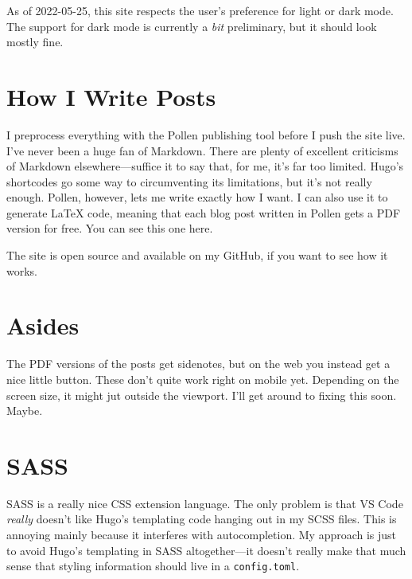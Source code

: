 \documentclass[a4paper,11pt,oneside,article]{memoir}
\begin{document}
As of 2022-05-25, this site respects the user's preference for light or dark mode. The support for dark mode is currently a \emph{bit} preliminary, but it should look mostly fine.

\chapter[How I Write Posts]{How I Write Posts}

I preprocess everything with the Pollen publishing tool before I push the site live. I've never been a huge fan of Markdown. There are plenty of excellent criticisms of Markdown elsewhere—suffice it to say that, for me, it's far too limited. Hugo's shortcodes go some way to circumventing its limitations, but it's not really enough. Pollen, however, lets me write exactly how I want. I can also use it to generate \LaTeX{} code, meaning that each blog post written in Pollen gets a PDF version for free. You can see this one here.

The site is open source and available on my GitHub, if you want to see how it works.

\chapter[Asides]{Asides}

The PDF versions of the posts get sidenotes, but on the web you instead get a nice little button.  These don't quite work right on mobile yet. Depending on the screen size, it might jut outside the viewport. I'll get around to fixing this soon. Maybe.

\chapter[SASS]{SASS}

SASS is a really nice CSS extension language. The only problem is that VS Code \emph{really} doesn't like Hugo's templating code hanging out in my SCSS files. This is annoying mainly because it interferes with autocompletion. My approach is just to avoid Hugo's templating in SASS altogether—it doesn't really make that much sense that styling information should live in a \texttt{config.toml}.
\end{document}
